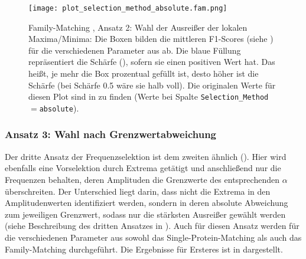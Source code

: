         \begin{figure}[H]
            \texttt{[image: plot\_selection\_method\_absolute.fam.png]}
            \caption[Family-Matching , Ansatz 2:  Wahl der Ausreißer der lokalen Maxima/Minima]{Family-Matching , Ansatz 2:  Wahl der Ausreißer der lokalen Maxima/Minima: Die Boxen bilden die mittleren F1-Scores (siehe ) für die verschiedenen Parameter aus  ab. Die blaue Füllung repräsentiert die Schärfe (), sofern sie einen positiven Wert hat. Das heißt, je mehr die Box prozentual gefüllt ist, desto höher ist die Schärfe (bei Schärfe 0.5 wäre sie halb voll). Die originalen Werte für diesen Plot sind in  zu finden (Werte bei Spalte \texttt{Selection\_Method}$=$\texttt{absolute}).}
            \label{fig:selection_method.absolute.fam}
        \end{figure}

        \subsubsection{Ansatz 3: Wahl nach Grenzwertabweichung} %
        \label{ssub:ansatz_3_results}
        Der dritte Ansatz der Frequenzselektion ist dem zweiten ähnlich (). Hier wird ebenfalls eine Vorselektion durch Extrema getätigt und anschließend nur die Frequenzen behalten, deren Amplituden die Grenzwerte des entsprechenden $\alpha$ überschreiten. Der Unterschied liegt darin, dass nicht die Extrema in den Amplitudenwerten identifiziert werden, sondern in deren absolute Abweichung zum jeweiligen Grenzwert, sodass nur die stärksten Ausreißer gewählt werden (siehe Beschreibung des dritten Ansatzes in ). Auch für diesen Ansatz werden für die verschiedenen Parameter aus  sowohl das Single-Protein-Matching als auch das Family-Matching durchgeführt. Die Ergebnisse für Ersteres ist in  dargestellt.
        
